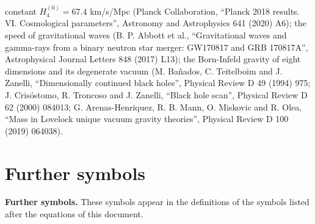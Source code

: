 \documentclass[
  10pt,
]{article}
\begin{document}
constant \(H_4^{(0)} = 67.4\) km/s/Mpc (Planck Collaboration, ``Planck
2018 results. VI. Cosmological parameters'', Astronomy and Astrophysics
641 (2020) A6); the speed of gravitational waves (B. P. Abbott et al.,
``Gravitational waves and gamma-rays from a binary neutron star merger:
GW170817 and GRB 170817A'', Astrophysical Journal Letters 848 (2017)
L13); the Born-Infeld gravity of eight dimensions and its degenerate
vacuum (M. Bañados, C. Teitelboim and J. Zanelli, ``Dimensionally
continued black holes'', Physical Review D 49 (1994) 975; J. Crisóstomo,
R. Troncoso and J. Zanelli, ``Black hole scan'', Physical Review D 62
(2000) 084013; G. Arenas-Henriquez, R. B. Mann, O. Miskovic and R. Olea,
``Mass in Lovelock unique vacuum gravity theories'', Physical Review D
100 (2019) 064038).

\hypertarget{further-symbols}{%
\section{Further symbols}\label{further-symbols}}

\textbf{Further symbols.} These symbols appear in the definitions of the
symbols listed after the equations of this document.
\end{document}
